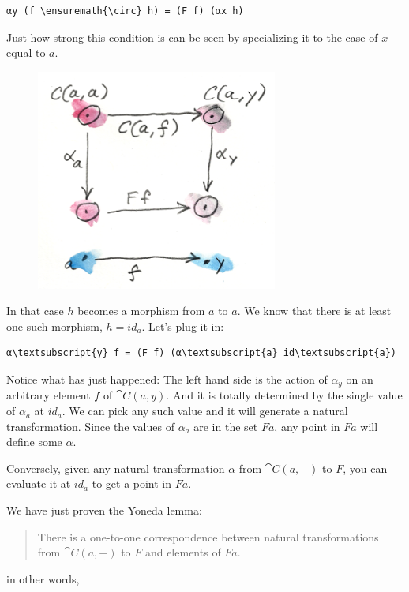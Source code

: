\begin{Verbatim}[commandchars=\\\{\}]
αy (f \ensuremath{\circ} h) = (F f) (αx h)
\end{Verbatim}
Just how strong this condition is can be seen by specializing it to the
case of $x$ equal to $a$.

\begin{figure}[H]
\centering
\includegraphics[width=3.12500in]{images/yoneda2.png}
\end{figure}

\noindent
In that case $h$ becomes a morphism from $a$ to
$a$. We know that there is at least one such morphism,
$h = id_{a}$. Let's plug it in:

\begin{Verbatim}[commandchars=\\\{\}]
α\textsubscript{y} f = (F f) (α\textsubscript{a} id\textsubscript{a})
\end{Verbatim}
Notice what has just happened: The left hand side is the action of
$α_y$ on an arbitrary element $f$ of $\cat{C}(a, y)$. And
it is totally determined by the single value of $α_a$ at
$id_a$. We can pick any such value and it will generate a natural
transformation. Since the values of $α_a$ are in the set
$F a$, any point in $F a$ will define some $α$.

Conversely, given any natural transformation $α$ from
$\cat{C}(a, -)$ to $F$, you can evaluate it at $id_a$ to
get a point in $F a$.

We have just proven the Yoneda lemma:

\begin{quote}
There is a one-to-one correspondence between natural transformations
from $\cat{C}(a, -)$ to $F$ and elements of $F a$. 
\end{quote}
in other words,


